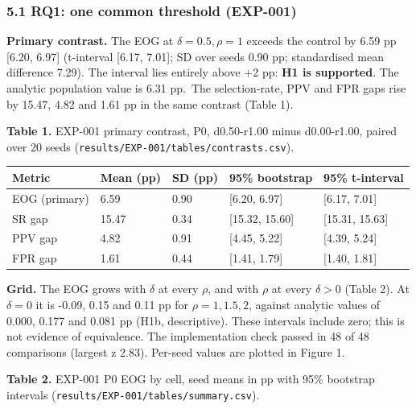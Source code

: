 \documentclass[
]{article}
\begin{document}
\subsubsection{5.1 RQ1: one common threshold
(EXP-001)}\label{rq1-one-common-threshold-exp-001}

\textbf{Primary contrast.} The EOG at \(\delta = 0.5, \rho = 1\) exceeds
the control by 6.59 pp {[}6.20, 6.97{]} (t-interval {[}6.17, 7.01{]}; SD
over seeds 0.90 pp; standardised mean difference 7.29). The interval
lies entirely above +2 pp: \textbf{H1 is supported}. The analytic
population value is 6.31 pp.~The selection-rate, PPV and FPR gaps rise
by 15.47, 4.82 and 1.61 pp in the same contrast (Table 1).

\textbf{Table 1.} EXP-001 primary contrast, P0, d0.50-r1.00 minus
d0.00-r1.00, paired over 20 seeds
(\texttt{results/EXP-001/tables/contrasts.csv}).

\begin{longtable}[]{@{}lllll@{}}
\toprule\noalign{}
Metric & Mean (pp) & SD (pp) & 95\% bootstrap & 95\% t-interval \\
\midrule\noalign{}
\endhead
\bottomrule\noalign{}
\endlastfoot
EOG (primary) & 6.59 & 0.90 & {[}6.20, 6.97{]} & {[}6.17, 7.01{]} \\
SR gap & 15.47 & 0.34 & {[}15.32, 15.60{]} & {[}15.31, 15.63{]} \\
PPV gap & 4.82 & 0.91 & {[}4.45, 5.22{]} & {[}4.39, 5.24{]} \\
FPR gap & 1.61 & 0.44 & {[}1.41, 1.79{]} & {[}1.40, 1.81{]} \\
\end{longtable}

\textbf{Grid.} The EOG grows with \(\delta\) at every \(\rho\), and with
\(\rho\) at every \(\delta > 0\) (Table 2). At \(\delta = 0\) it is
-0.09, 0.15 and 0.11 pp for \(\rho = 1, 1.5, 2\), against analytic
values of 0.000, 0.177 and 0.081 pp (H1b, descriptive). These intervals
include zero; this is not evidence of equivalence. The implementation
check passed in 48 of 48 comparisons (largest \textbar z\textbar{}
2.83). Per-seed values are plotted in Figure 1.

\textbf{Table 2.} EXP-001 P0 EOG by cell, seed means in pp with 95\%
bootstrap intervals (\texttt{results/EXP-001/tables/summary.csv}).
\end{document}
